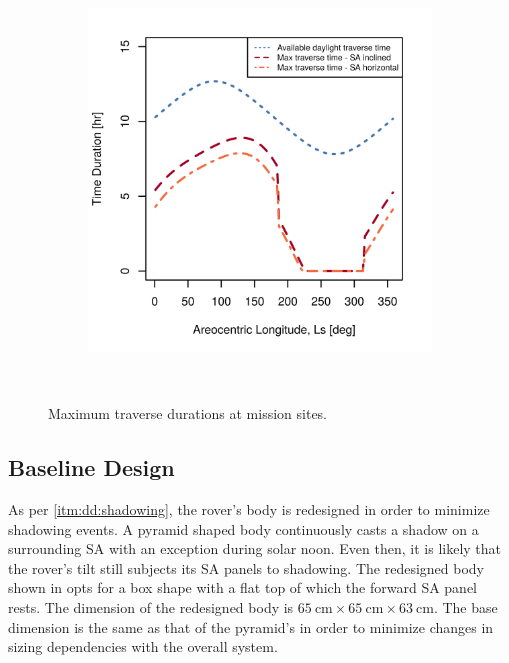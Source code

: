 \begin{figure}[h]
\begin{subfigure}[t]{\subfigureWidth}
        \includegraphics[height=\graphicsHeight]{sections/design/solar-array/plots/ismeniuscavus-75w-max-traverse-durations-for-solar-cell-coverage-area-24m2.png}
		\label{fig:plot:sub:final-maximum-traverse-durations-ismenius-cavus}
	\end{subfigure}\\[0.8ex]
    \caption[Maximum traverse durations at mission sites]
            {Maximum traverse durations at mission sites.}
    \label{fig:plot:final-maximum-traverse-durations-at-missions-sites}
\vspace{-2ex}
\end{figure}



\clearpage
\subsection{Baseline Design}
As per \ref{itm:dd:shadowing}, the rover's body is redesigned in order to minimize shadowing events. A pyramid shaped body continuously casts a shadow on a surrounding \ac{SA} with an exception during solar noon. Even then, it is likely that the rover's tilt still subjects its \ac{SA} panels to shadowing. The redesigned body shown in  opts for a box shape with a flat top of which the forward \ac{SA} panel rests. The dimension of the redesigned body is $\SI{65}{\centi\meter}\times\SI{65}{\centi\meter}\times\SI{63}{\centi\meter}$. The base dimension is the same as that of the pyramid's in order to minimize changes in sizing dependencies with the overall system.

